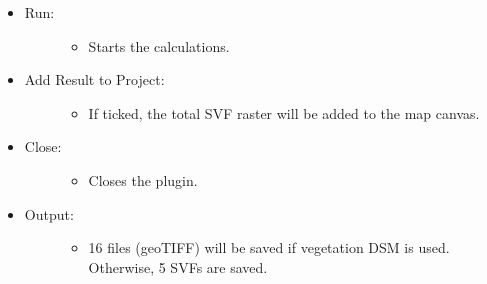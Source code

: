 \documentclass[letterpaper,10pt,english]{sphinxmanual}
\begin{document}
\begin{itemize}
\begin{description}
\end{description}

\item {} \begin{description}
\item[{Run:}] \leavevmode\begin{itemize}
\item {} 
Starts the calculations.

\end{itemize}

\end{description}

\item {} \begin{description}
\item[{Add Result to Project:}] \leavevmode\begin{itemize}
\item {} 
If ticked, the total SVF raster will be added to the map canvas.

\end{itemize}

\end{description}

\item {} \begin{description}
\item[{Close:}] \leavevmode\begin{itemize}
\item {} 
Closes the plugin.

\end{itemize}

\end{description}

\item {} \begin{description}
\item[{Output:}] \leavevmode\begin{itemize}
\item {} 
16 files (geoTIFF) will be saved if vegetation DSM is used. Otherwise, 5 SVFs are saved.

\end{itemize}

\end{description}

\end{itemize}
\end{document}
